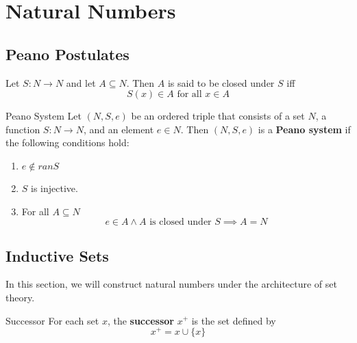 \section{Natural Numbers}

\subsection{Peano Postulates}

\begin{definition}{}{}
    Let $S : N \to N$ and let $A \subseteq N$. Then $A$ is said to be closed under $S$ iff
    \begin{equation*}
        S(x) \in A \text{ for all } x \in A
    \end{equation*}
\end{definition}

\begin{definition}{Peano System}{}
    Let $(N,S,e)$ be an ordered triple that consists of a set $N$, a
    function $S : N \to N$, and an element $e \in N$. Then $(N,S,e)$
    is a \textbf{Peano system} if the following conditions hold:
    \begin{enumerate}

        \item $e \notin ranS$
        \item $S$ is injective.
        \item For all $A \subseteq N$
        \begin{equation*}
            e \in A \land A \text{ is closed under } S \implies A = N
        \end{equation*}

    \end{enumerate}
    
\end{definition}

\subsection{Inductive Sets}

In this section, we will construct natural numbers under the 
architecture of set theory.

\begin{definition}{Successor}{}
    For each set $x$, the \textbf{successor} $x^{+}$ is the set defined by 
    \begin{equation*}
        x^{+} = x \cup \{x\}
    \end{equation*}
\end{definition}

